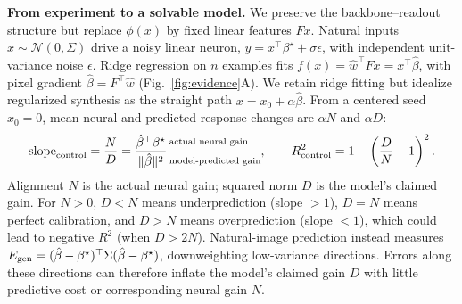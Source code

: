 \documentclass[12pt,a4paper]{article}
\newcommand{\head}[1]{\par\noindent\textbf{#1}\enspace\ignorespaces}
\newcommand{\bh}{\hat\beta}
\newcommand{\bt}{\beta^\star}
\begin{document}
\head{From experiment to a solvable model.}
We preserve the backbone--readout structure but replace $\phi(x)$ by fixed linear features $Fx$. Natural inputs $x\sim\mathcal N(0,\Sigma)$ drive a noisy linear neuron, $y=x^\top\bt+\sigma\epsilon$, with independent unit-variance noise $\epsilon$. Ridge regression on $n$ examples fits $f(x)=\hat w^\top Fx=x^\top\bh$, with pixel gradient $\bh=F^\top\hat w$ (Fig.~\ref{fig:evidence}A). We retain ridge fitting but idealize regularized synthesis as the straight path $x=x_0+\alpha\bh$. From a centered seed $x_0=0$, mean neural and predicted response changes are $\alpha N$ and $\alpha D$:
\begin{equation}
\mathrm{slope}_{\rm control}=\frac ND=
\frac{\bh^\top\bt}{\|\bh\|^2}\,
\begin{subarray}{l}
\text{actual neural gain}\\[8pt]
\text{model-predicted gain}
\end{subarray},
\qquad R^2_{\rm control}=1-\left(\frac DN-1\right)^2.
\label{eq:geometry}
\end{equation}
Alignment $N$ is the actual neural gain; squared norm $D$ is the model's claimed gain. For $N>0$, $D<N$ means underprediction (slope $>1$), $D=N$ means perfect calibration, and $D>N$ means overprediction (slope $<1$), which could lead to negative $R^2$ (when $D>2N$). Natural-image prediction instead measures $E_{\rm gen}=(\bh-\bt)^\top\Sigma(\bh-\bt)$, downweighting low-variance directions. Errors along these directions can therefore inflate the model's claimed gain $D$ with little predictive cost or corresponding neural gain $N$.
\end{document}
